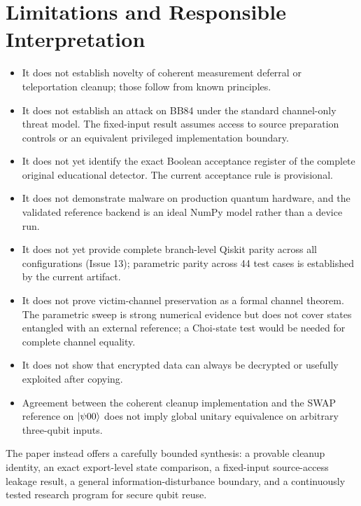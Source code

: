 \section{Limitations and Responsible Interpretation}
\label{sec:limitations}

\begin{limitbox}
\begin{itemize}
  \item It does not establish novelty of coherent measurement deferral or
  teleportation cleanup; those follow from known principles.
  \item It does not establish an attack on BB84 under the standard channel-only
  threat model. The fixed-input result assumes access to source preparation
  controls or an equivalent privileged implementation boundary.
  \item It does not yet identify the exact Boolean acceptance register of the
  complete original educational detector. The current acceptance rule is
  provisional.
  \item It does not demonstrate malware on production quantum hardware, and the
  validated reference backend is an ideal NumPy model rather than a device run.
  \item It does not yet provide complete branch-level Qiskit parity across all
  configurations (Issue 13); parametric parity across 44 test cases is
  established by the current artifact.
  \item It does not prove victim-channel preservation as a formal channel
  theorem. The parametric sweep is strong numerical evidence but does not
  cover states entangled with an external reference; a Choi-state test would
  be needed for complete channel equality.
  \item It does not show that encrypted data can always be decrypted or usefully
  exploited after copying.
  \item Agreement between the coherent cleanup implementation and the SWAP
  reference on $\ket{\psi00}$ does not imply global unitary equivalence on
  arbitrary three-qubit inputs.
\end{itemize}
\end{limitbox}

The paper instead offers a carefully bounded synthesis: a provable cleanup
identity, an exact export-level state comparison, a fixed-input source-access
leakage result, a general information-disturbance boundary, and a continuously
tested research program for secure qubit reuse.
